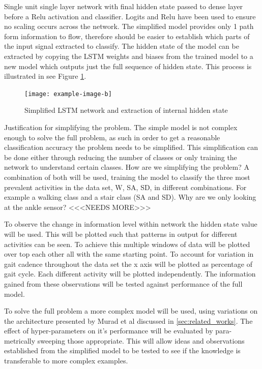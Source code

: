 \documentclass[sensors,article,submit,moreauthors,pdftex]{Definitions/mdpi}
\begin{document}
Single unit single layer network with final hidden state passed to dense layer before a Relu activation and classifier. Logits and Relu have been used to ensure no scaling occurs across the network. The simplified model provides only 1 path form information to flow, therefore should be easier to establish which parts of the input signal extracted to classify. The hidden state of the model can be extracted by copying the LSTM weights and biases from the trained model to a new model which outputs just the full sequence of hidden state. This process is illustrated in see Figure \ref{fig:simplifier_lstm_model}.

\begin{figure}[!htb]
    \centering
    \texttt{[image: example-image-b]}
    \caption{Simplified LSTM network and extraction of internal hidden state}
    \label{fig:simplifier_lstm_model}
\end{figure}

Justification for simplifying the problem. The simple model is not complex enough to solve the full problem, as such in order to get a reasonable classification accuracy the problem needs to be simplified. This simplification can be done either through reducing the number of classes or only training the network to understand certain classes. How are we simplifying the problem? A combination of both will be used, training the model to classify the three most prevalent activities in the data set, W, SA, SD, in different combinations. For example a walking class and a stair class (SA and SD). Why are we only looking at the ankle sensor? <<<NEEDS MORE>>>

To observe the change in information level within network the hidden state value will be used. This will be plotted such that patterns in output for different activities can be seen. To achieve this multiple windows of data will be plotted over top each other all with the same starting point. To account for variation in gait cadence throughout the data set the x axis will be plotted as percentage of gait cycle. Each different activity will be plotted independently. The information gained from these observations will be tested against performance of the full model.

To solve the full problem a more complex model will be used, using variations on the architecture presented by Murad et al discussed in \ref{sec:related_works}. The effect of hyper-parameters on it's performance will be evaluated by para-metrically sweeping those appropriate. This will allow ideas and observations established from the simplified model to be tested to see if the knowledge is transferable to more complex examples.
\end{document}
